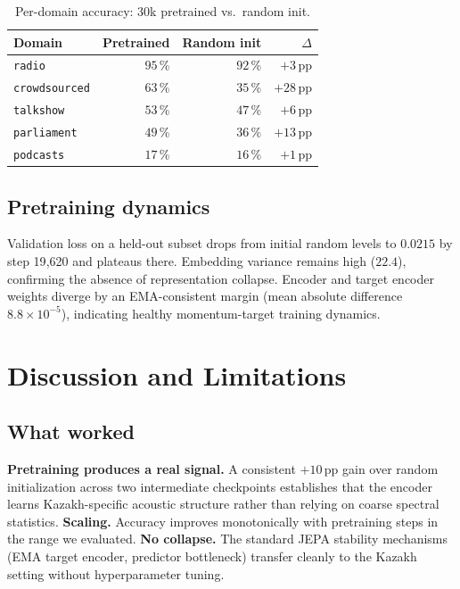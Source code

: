 \documentclass[conference]{IEEEtran}
\begin{document}
\begin{table}[t]
\centering
\caption{Per-domain accuracy: 30k pretrained vs.\ random init.}
\label{tab:perdomain}
\begin{tabular}{lrrr}
\toprule
Domain & Pretrained & Random init & $\Delta$ \\
\midrule
\texttt{radio}        & $95$\,\% & $92$\,\% & $+3$\,pp  \\
\texttt{crowdsourced} & $63$\,\% & $35$\,\% & $+28$\,pp \\
\texttt{talkshow}     & $53$\,\% & $47$\,\% & $+6$\,pp  \\
\texttt{parliament}   & $49$\,\% & $36$\,\% & $+13$\,pp \\
\texttt{podcasts}     & $17$\,\% & $16$\,\% & $+1$\,pp  \\
\bottomrule
\end{tabular}
\end{table}

\subsection{Pretraining dynamics}

Validation loss on a held-out subset drops from initial random levels to $0.0215$ by step 19{,}620 and plateaus there. Embedding variance remains high ($22.4$), confirming the absence of representation collapse. Encoder and target encoder weights diverge by an EMA-consistent margin (mean absolute difference $8.8 \times 10^{-5}$), indicating healthy momentum-target training dynamics.

\section{Discussion and Limitations}

\subsection{What worked}

\textbf{Pretraining produces a real signal.} A consistent $+10$\,pp gain over random initialization across two intermediate checkpoints establishes that the encoder learns Kazakh-specific acoustic structure rather than relying on coarse spectral statistics. \textbf{Scaling.} Accuracy improves monotonically with pretraining steps in the range we evaluated. \textbf{No collapse.} The standard JEPA stability mechanisms (EMA target encoder, predictor bottleneck) transfer cleanly to the Kazakh setting without hyperparameter tuning.
\end{document}
